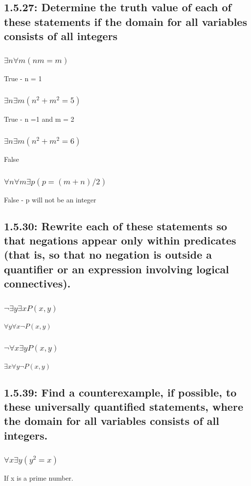 \documentclass[12pt, a4paper]{report}
\begin{document}
			\subsection{1.5.27: Determine the truth value of each of these statements if the domain for all variables consists of all integers}
				\subsubsection{$\exists n \forall m (nm=m)$}
					True - n = 1
				\subsubsection{$\exists n \exists m (n^2+m^2=5)$}
					True - n =1 and m = 2
				\subsubsection{$\exists n \exists m(n^2+m^2=6)$}
					False
				\subsubsection{$\forall n \forall m \exists p (p=(m+n)/2)$}
					False - p will not be an integer
					\subsection{1.5.30: Rewrite each of these statements so that negations appear only within predicates (that is, so that no negation is outside a quantiﬁer or an expression involving logical connectives).}
				\subsubsection{$\neg\exists y \exists x P(x,y)$}
					$\forall y \forall x \neg P(x,y)$
				\subsubsection{$\neg \forall x \exists y P(x,y)$}
					$\exists x \forall y \neg P(x,y)$
			\setcounter{subsection}{38}
			\subsection{1.5.39: Find a counterexample, if possible, to these universally quantiﬁed statements, where the domain for all variables consists of all integers.}
				\subsubsection{$\forall x \exists y (y^2=x)$}
					If x is a prime number.
\end{document}
